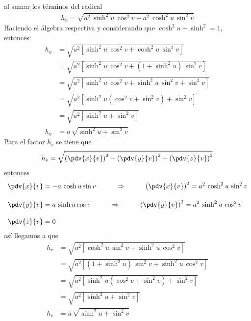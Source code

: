 al sumar los términos del radical
\begin{align*}
h_{u} = \sqrt{a^{2} \, \sinh^{2} u \, \cos^{2} v + a^{2} \, \cosh^{2} u \, \sin^{2} v}
\end{align*}
Haciendo el álgebra respectiva y considerando que $\cosh^{2} u - \sinh^{2} = 1$, entonces:
\begin{align*}
h_{u} &= \sqrt{a^{2} \left[ \sinh^{2} u \, \cos^{2} v + \cosh^{2} u \, \sin^{2} v \right] } \\[1em]
&= \sqrt{a^{2} \left[ \sinh^{2} u \, \cos^{2} v + (1 + \sinh^{2} u) \, \sin^{2} v \right] } \\[1em]
&= \sqrt{a^{2} \left[ \sinh^{2} u \, \cos^{2} v + \sinh^{2} u \, \sin^{2} v + \sin^{2} v \right] } \\[1em]
&= \sqrt{a^{2} \left[ \sinh^{2} u ( \cos^{2} v + \sin^{2}v ) + \sin^{2} v \right] } \\[1em]
&= \sqrt{a^{2} \left[ \sinh^{2} u + \sin^{2} v  \right] } \\[1em]
h_{u} &= a \, \sqrt{ \sinh^{2} u + \sin^{2} v}
\end{align*}
Para el factor $h_{v}$ se tiene que
\begin{align*}
h_{v} = \sqrt{ \left( \pdv{x}{v} \right)^{2} + \left( \pdv{y}{v} \right)^{2} + \left( \pdv{z}{v} \right)^{2}}
\end{align*}
entonces
\begin{align*}
\pdv{x}{v} &= - a \, \cosh u \sin v \hspace{1cm} \Rightarrow \hspace{1cm} \left( \pdv{x}{v} \right)^{2} = a^{2} \, \cosh^{2} u \, \sin^{2} v \\[1em]
\pdv{y}{v} &= a \, \sinh u \cos v \hspace{1cm} \Rightarrow \hspace{1cm} \left( \pdv{y}{v} \right)^{2} = a^{2} \, \sinh^{2} u \, \cos^{2} v \\[1em]
\pdv{z}{v} &= 0
\end{align*}
así llegamos a que
\begin{align*}
h_{v} &= \sqrt{a^{2} \left[ \cosh^{2} u \, \sin^{2} v + \sinh^{2} u \, \cos^{2} v \right] } \\[1em]
&= \sqrt{a^{2} \left[ (1 + \sinh^{2} u) \, \sin^{2} v + \sinh^{2} u \, \cos^{2} v \right] } \\[1em]
&= \sqrt{a^{2} \left[ \sinh^{2} u (\cos^{2} v +  \sin^{2} v)+ \sin^{2} v \right] } \\[1em]
&= \sqrt{a^{2} \left[ \sinh^{2} u + \sin^{2} v  \right] } \\[1em]
h_{v} &= a \, \sqrt{ \sinh^{2} u + \sin^{2} v}
\end{align*}
